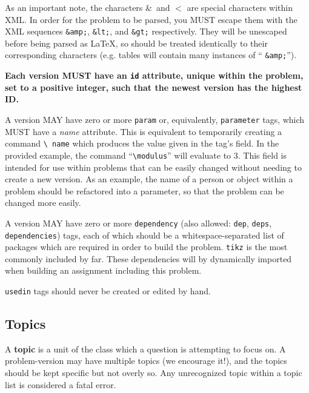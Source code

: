     As an important note, the characters \&\ and $<$ are special 
    characters within XML. In order for the problem to be parsed, you MUST 
    escape them with the XML sequences \texttt{\&amp;}, \texttt{\&lt;}, 
    and \texttt{\&gt;} respectively. They will be unescaped before being 
    parsed as \LaTeX, so should be treated identically to their 
    corresponding characters (e.g. tables will contain many instances of ``
    \texttt{\&amp;}'').
    
    \textbf{Each version MUST have an \texttt{id} attribute, unique within 
    the problem, set to a positive integer, such that the newest version 
    has the highest ID.}
    
    A version MAY have zero or more \texttt{param} or, equivalently, 
    \texttt{parameter} tags, which MUST have a \textit{name} attribute. This is 
    equivalent to temporarily creating a command \texttt{\textbackslash 
    name} which produces the value given in the tag's field. In the 
    provided example, the command ``\texttt{\textbackslash modulus}'' will 
    evaluate to 3. This field is intended for use within problems that can 
    be easily changed without needing to create a new version. As an 
    example, the name of a person or object within a problem should be 
    refactored into a parameter, so that the problem can be changed more easily.
    
    A version MAY have zero or more \texttt{dependency} (also allowed: 
    \texttt{dep}, \texttt{deps}, \texttt{dependencies}) tags, each of 
    which should be a whitespace-separated list of packages which are 
    required in order to build the problem. \texttt{tikz} is the most 
    commonly included by far. These dependencies will by dynamically 
    imported when building an assignment including this problem.
    
    \texttt{usedin} tags should never be created or edited by hand.
  
  \subsection{Topics}
    A \textbf{topic} is a unit of the class which a question is attempting 
    to focus on. A problem-version may have multiple topics (we encourage 
    it!), and the topics should be kept specific but not overly so. Any 
    unrecognized topic within a topic list is considered a fatal error.
    
